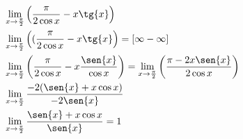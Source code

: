 \begin{ex}
\begin{align}
&\lim_{x\rightarrow \frac{\pi}{2}} \left(\frac{\pi}{2\cos{x}}-x\tg{x}\right)\nonumber\\
&\lim_{x\rightarrow \frac{\pi}{2}} \left((\frac{\pi}{2\cos{x}}-x\tg{x}\right)=[\infty-\infty]\nonumber\\
&\lim_{x\rightarrow \frac{\pi}{2}} \left(\frac{\pi}{2\cos{x}}-x\frac{\sen{x}}{\cos{x}}\right)=\lim_{x\rightarrow \frac{\pi}{2}} \left(\frac{\pi-2x\sen{x}}{2\cos{x}}\right)\nonumber\\
&\lim_{x\rightarrow \frac{\pi}{2}} \frac{-2(\sen{x}+x\cos{x})}{-2\sen{x}}\nonumber\\
&\lim_{x\rightarrow \frac{\pi}{2}} \frac{\sen{x}+x\cos{x}}{\sen{x}}=1\nonumber
\end{align}
\end{ex}
